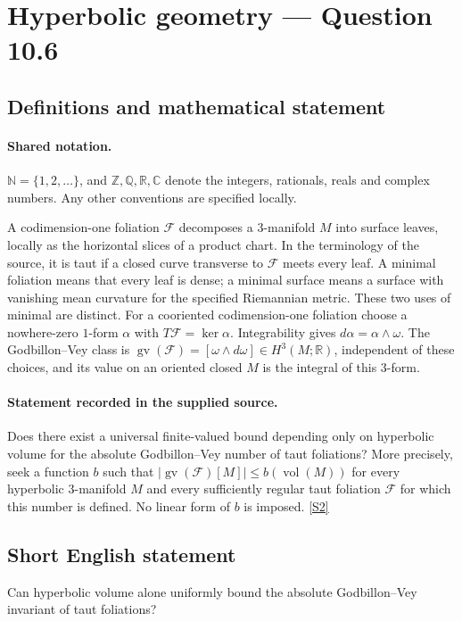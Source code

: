 \documentclass[11pt]{article}
\newcommand{\sref}[2]{\hyperlink{source:#1:#2}{[S#2]}}
\begin{document}
\section{Hyperbolic geometry — Question 10.6}\label{statement}

\subsection{Definitions and mathematical statement}

\paragraph{Shared notation.}$\mathbb N=\{1,2,\ldots\}$, and $\mathbb Z,\mathbb Q,\mathbb R,\mathbb C$ denote the integers, rationals, reals and complex numbers. Any other conventions are specified locally.


A codimension-one foliation $\mathcal F$ decomposes a $3$-manifold $M$ into surface leaves, locally as the horizontal slices of a product chart. In the terminology of the source, it is taut if a closed curve transverse to $\mathcal F$ meets every leaf. A minimal foliation means that every leaf is dense; a minimal surface means a surface with vanishing mean curvature for the specified Riemannian metric. These two uses of minimal are distinct. For a cooriented codimension-one foliation choose a nowhere-zero $1$-form $\alpha$ with $T\mathcal F=\ker\alpha$. Integrability gives $d\alpha=\alpha\wedge\omega$. The Godbillon--Vey class is $\operatorname{gv}(\mathcal F)=[\omega\wedge d\omega]\in H^3(M;\mathbb R)$, independent of these choices, and its value on an oriented closed $M$ is the integral of this $3$-form.
\paragraph{Statement recorded in the supplied source.}
Does there exist a universal finite-valued bound depending only on hyperbolic volume for the absolute Godbillon--Vey number of taut foliations? More precisely, seek a function $b$ such that $|\operatorname{gv}(\mathcal F)[M]|\le b(\operatorname{vol}(M))$ for every hyperbolic $3$-manifold $M$ and every sufficiently regular taut foliation $\mathcal F$ for which this number is defined. No linear form of $b$ is imposed. \sref{statement}{2}
\subsection{Short English statement}
Can hyperbolic volume alone uniformly bound the absolute Godbillon--Vey invariant of taut foliations?
\end{document}
